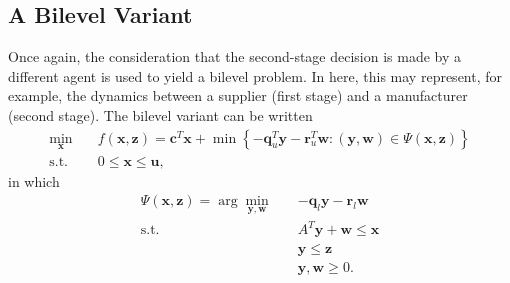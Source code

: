 \documentclass[12pt]{article}
\begin{document}
\subsection*{A Bilevel Variant}

Once again, the consideration that the second-stage decision is made by a different agent is used to yield a bilevel problem.
In here, this may represent, for example, the dynamics between a supplier (first stage) and a manufacturer (second stage).
The bilevel variant can be written
\begin{equation}\label{eq:multiproduct-ul}
\begin{split}
    \min_{\bm{x}} \quad & f(\bm{x},\bm{z}) = \bm{c}^{T}\bm{x} + \min\left\{ -\bm{q}^{T}_u \bm{y} -\bm{r}^{T}_u \bm{w} : (\bm{y},\bm{w})\in \Psi(\bm{x},\bm{z}) \right\}  \\
    \textrm{s.t.} \quad & 0\le \bm{x}\le \bm{u}
,\end{split}
\end{equation}
in which
\begin{equation}\label{eq:multiproduct-ll}
\begin{split}
    \Psi(\bm{x},\bm{z}) = \arg\min_{\bm{y},\bm{w}} \quad & -\bm{q}_l \bm{y} - \bm{r}_l \bm{w} \\
    \textrm{s.t.} \quad & A^{T}\bm{y}+\bm{w} \le \bm{x} \\
      & \bm{y}\le \bm{z} \\
      & \bm{y},\bm{w} \ge 0
.\end{split}
\end{equation}
\end{document}
